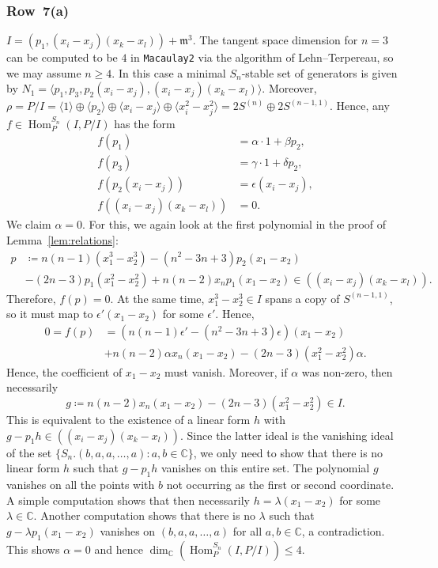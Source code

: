 \documentclass[11pt]{amsart}
\theoremstyle{definition}
\newcommand{\CC}{\mathbb{C}}
\newcommand{\mm}{\mathfrak{m}}
\DeclareMathOperator{\Hom}{Hom}
\begin{document}
\subsubsection{Row~7(a)} $I = (p_1,(x_i-x_j)(x_k-x_l)) + \mm^3$. The tangent space dimension for $n=3$ can be computed to be $4$ in \texttt{Macaulay2} via the algorithm of Lehn--Terpereau, so we may assume $n \geq 4$. In this case a minimal $S_n$-stable set of generators is given by $N_1 = \langle p_1, p_3, p_2(x_i-x_j), (x_i-x_j)(x_k-x_l) \rangle$. Moreover, $\rho = P/I = \langle 1 \rangle \oplus \langle p_2 \rangle \oplus \langle x_i - x_j \rangle \oplus \langle x_i^2 - x_j^2 \rangle = 2S^{(n)} \oplus 2S^{(n-1,1)}$.
Hence, any $f \in \Hom^{S_n}_{P}(I,P/I)$ has the form
\begin{align*}
    f(p_1) &= \alpha \cdot 1 + \beta p_2, \\
    f(p_3) &= \gamma \cdot 1 + \delta p_2, \\
    f(p_2(x_i-x_j)) &= \epsilon (x_i-x_j), \\
    f((x_i-x_j)(x_k-x_l)) &= 0.
\end{align*}
We claim $\alpha = 0$. For this, we again look at the first polynomial in the proof of Lemma~\ref{lem:relations}:
\begin{align*}
    p &\coloneqq n(n-1)(x_1^3-x_2^3) - (n^2-3n+3)p_2(x_1-x_2) \\ &- (2n-3)p_1(x_1^2-x_2^2) + n(n-2)x_n p_1(x_1-x_2) \in ((x_i-x_j)(x_k-x_l)).
\end{align*}
Therefore, $f(p) = 0$. At the same time, $x_1^3 - x_2^3 \in I$ spans a copy of $S^{(n-1,1)}$, so it must map to $\epsilon' (x_1 - x_2)$ for some $\epsilon'$. Hence,
\begin{align*}
    0 = f(p) &= \left(n(n-1) \epsilon' - (n^2-3n+3) \epsilon \right) (x_1-x_2) \\ &+ n(n-2) \alpha x_n(x_1-x_2) - (2n-3)(x_1^2 - x_2^2) \alpha.
\end{align*}
Hence, the coefficient of $x_1-x_2$ must vanish. Moreover, if $\alpha$ was non-zero, then necessarily
\begin{equation*}
    g \coloneqq n(n-2) x_n(x_1-x_2) - (2n-3)(x_1^2 - x_2^2) \in I.
\end{equation*}
This is equivalent to the existence of a linear form $h$ with $g - p_1 h \in ((x_i-x_j)(x_k-x_l))$. Since the latter ideal is the vanishing ideal of the set $\{S_n.(b,a,a,\ldots,a) : a,b \in \CC\}$, we only need to show that there is no linear form $h$ such that $g - p_1 h$ vanishes on this entire set. The polynomial $g$ vanishes on all the points with $b$ not occurring as the first or second coordinate. A simple computation shows that then necessarily $h = \lambda (x_1-x_2)$ for some $\lambda \in \CC$. Another computation shows that there is no $\lambda$ such that $g - \lambda p_1 (x_1-x_2)$ vanishes on $(b,a,a,\ldots,a)$ for all $a,b \in \CC$, a contradiction. This shows $\alpha = 0$ and hence $\dim_\CC(\Hom^{S_n}_P(I,P/I)) \leq 4$. 
\end{document}
